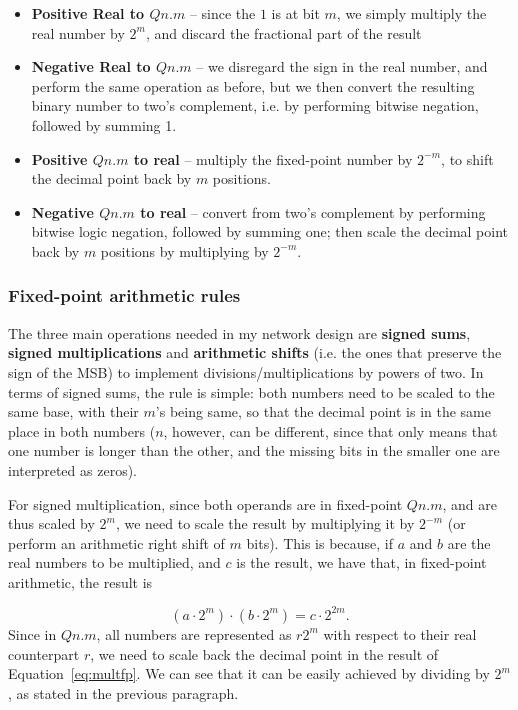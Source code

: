\begin{itemize}
    \item \textbf{Positive Real to $Qn.m$} -- since the $1$ is at bit $m$, we simply multiply the real number by $2^m$, and discard the fractional part of the result
    \item \textbf{Negative Real to $Qn.m$} -- we disregard the sign in the real number, and perform the same operation as before, but we then convert the resulting binary number to two's complement, i.e. by performing bitwise negation, followed by summing 1.
    \item \textbf{Positive $Qn.m$ to real} -- multiply the fixed-point number by $2^{-m}$, to shift the decimal point back by $m$ positions.
    \item \textbf{Negative $Qn.m$ to real} -- convert from two's complement by performing bitwise logic negation, followed by summing one; then scale the decimal point back by $m$ positions by multiplying by $2^{-m}$.
\end{itemize}

\subsubsection{Fixed-point arithmetic rules}\label{sec:arithrulesfp}
The three main operations needed in my network design are \textbf{signed sums}, \textbf{signed multiplications} and \textbf{arithmetic shifts} (i.e. the ones that preserve the sign of the MSB)
to implement divisions/multiplications by powers of two. In terms of signed sums, the rule is simple: both numbers need to be scaled to the same base, with their $m$'s being same,
so that the decimal point is in the same place in both numbers ($n$, however, can be different, since that only means that one number is longer than the other, and the missing bits
in the smaller one are interpreted as zeros).

For signed multiplication, since both operands are in fixed-point $Qn.m$, and are thus scaled by $2^m$, we need to scale the result by multiplying it
by $2^{-m}$ (or perform an arithmetic right shift of $m$ bits). This is because, if $a$ and $b$ are the real numbers to be multiplied, and $c$ is the
result, we have that, in fixed-point arithmetic, the result is

\begin{equation}\label{eq:multfp}
    (a\cdot2^m) \cdot (b\cdot2^m) = c \cdot 2^{2m}.
\end{equation}
Since in $Qn.m$, all numbers are represented as $r 2^{m}$ with respect to their real counterpart $r$, we need to scale back the decimal point in the result of Equation~\ref{eq:multfp}. We can see
that it can be easily achieved by dividing by $2^m$, as stated in the previous paragraph.

